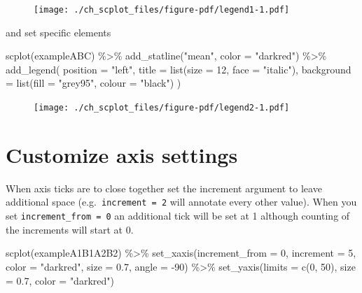 \documentclass[
  letterpaper,
  DIV=11,
  numbers=noendperiod]{scrreprt}
\newenvironment{Shaded}{\begin{snugshade}}{\end{snugshade}}
\newcommand{\AttributeTok}[1]{\textcolor[rgb]{0.40,0.45,0.13}{#1}}
\newcommand{\DecValTok}[1]{\textcolor[rgb]{0.68,0.00,0.00}{#1}}
\newcommand{\FloatTok}[1]{\textcolor[rgb]{0.68,0.00,0.00}{#1}}
\newcommand{\FunctionTok}[1]{\textcolor[rgb]{0.28,0.35,0.67}{#1}}
\newcommand{\NormalTok}[1]{\textcolor[rgb]{0.00,0.23,0.31}{#1}}
\newcommand{\SpecialCharTok}[1]{\textcolor[rgb]{0.37,0.37,0.37}{#1}}
\newcommand{\StringTok}[1]{\textcolor[rgb]{0.13,0.47,0.30}{#1}}
\begin{document}
\begin{figure}[H]

{\centering \texttt{[image: ./ch\_scplot\_files/figure-pdf/legend1-1.pdf]}

}

\end{figure}

and set specific elements

\begin{Shaded}
\begin{Highlighting}[]
\FunctionTok{scplot}\NormalTok{(exampleABC) }\SpecialCharTok{\%\textgreater{}\%}
  \FunctionTok{add\_statline}\NormalTok{(}\StringTok{"mean"}\NormalTok{, }\AttributeTok{color =} \StringTok{"darkred"}\NormalTok{) }\SpecialCharTok{\%\textgreater{}\%}
  \FunctionTok{add\_legend}\NormalTok{(}
    \AttributeTok{position =} \StringTok{"left"}\NormalTok{, }
    \AttributeTok{title =} \FunctionTok{list}\NormalTok{(}\AttributeTok{size =} \DecValTok{12}\NormalTok{, }\AttributeTok{face =} \StringTok{"italic"}\NormalTok{),}
    \AttributeTok{background =} \FunctionTok{list}\NormalTok{(}\AttributeTok{fill =} \StringTok{"grey95"}\NormalTok{, }\AttributeTok{colour =} \StringTok{"black"}\NormalTok{)}
\NormalTok{  )}
\end{Highlighting}
\end{Shaded}

\begin{figure}[H]

{\centering \texttt{[image: ./ch\_scplot\_files/figure-pdf/legend2-1.pdf]}

}

\end{figure}

\hypertarget{customize-axis-settings}{%
\section{Customize axis settings}\label{customize-axis-settings}}

When axis ticks are to close together set the increment argument to
leave additional space (e.g.~\texttt{increment\ =\ 2} will annotate
every other value). When you set \texttt{increment\_from\ =\ 0} an
additional tick will be set at 1 although counting of the increments
will start at 0.

\begin{Shaded}
\begin{Highlighting}[]
\FunctionTok{scplot}\NormalTok{(exampleA1B1A2B2) }\SpecialCharTok{\%\textgreater{}\%} 
  \FunctionTok{set\_xaxis}\NormalTok{(}\AttributeTok{increment\_from =} \DecValTok{0}\NormalTok{, }\AttributeTok{increment =} \DecValTok{5}\NormalTok{, }
            \AttributeTok{color =} \StringTok{"darkred"}\NormalTok{, }\AttributeTok{size =} \FloatTok{0.7}\NormalTok{, }\AttributeTok{angle =} \SpecialCharTok{{-}}\DecValTok{90}\NormalTok{) }\SpecialCharTok{\%\textgreater{}\%}
  \FunctionTok{set\_yaxis}\NormalTok{(}\AttributeTok{limits =} \FunctionTok{c}\NormalTok{(}\DecValTok{0}\NormalTok{, }\DecValTok{50}\NormalTok{), }\AttributeTok{size =} \FloatTok{0.7}\NormalTok{, }\AttributeTok{color =} \StringTok{"darkred"}\NormalTok{) }
\end{Highlighting}
\end{Shaded}
\end{document}
